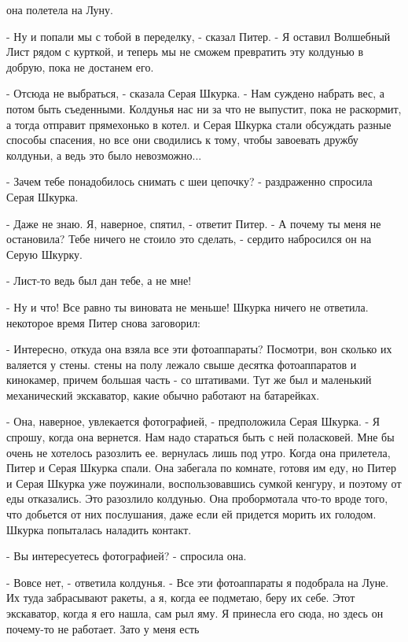 она полетела на Луну.
\par- Ну и попали мы с тобой в переделку, - сказал Питер. - Я оставил 
Волшебный Лист рядом с курткой, и теперь мы не сможем превратить эту 
колдунью в добрую, пока не достанем его.
\par- Отсюда не выбраться, - сказала Серая Шкурка. - Нам суждено 
набрать вес, а потом быть съеденными. Колдунья нас ни за что не 
выпустит, пока не раскормит, а тогда отправит прямехонько в котел.
 и Серая Шкурка стали обсуждать разные способы спасения, но 
все они сводились к тому, чтобы завоевать дружбу колдуньи, а ведь это 
было невозможно...
\par- Зачем тебе понадобилось снимать с шеи цепочку? - раздраженно 
спросила Серая Шкурка.
\par- Даже не знаю. Я, наверное, спятил, - ответит Питер. - А почему 
ты меня не остановила? Тебе ничего не стоило это сделать, - сердито 
набросился он на Серую Шкурку.
\par- Лист-то ведь был дан тебе, а не мне!
\par- Ну и что! Все равно ты виновата не меньше!
 Шкурка ничего не ответила.
 некоторое время Питер снова заговорил:
\par- Интересно, откуда она взяла все эти фотоаппараты? Посмотри, вон 
сколько их валяется у стены.
 стены на полу лежало свыше десятка фотоаппаратов и кинокамер, 
причем большая часть - со штативами. Тут же был и маленький 
механический экскаватор, какие обычно работают на батарейках.
\par- Она, наверное, увлекается фотографией, - предположила Серая 
Шкурка. - Я спрошу, когда она вернется. Нам надо стараться быть с ней 
поласковей. Мне бы очень не хотелось разозлить ее.
 вернулась лишь под утро. Когда она прилетела, Питер и 
Серая Шкурка спали. Она забегала по комнате, готовя им еду, но Питер и 
Серая Шкурка уже поужинали, воспользовавшись сумкой кенгуру, и поэтому 
от еды отказались. Это разозлило колдунью. Она пробормотала что-то 
вроде того, что добьется от них послушания, даже если ей придется 
морить их голодом.
 Шкурка попыталась наладить контакт.
\par- Вы интересуетесь фотографией? - спросила она.
\par- Вовсе нет, - ответила колдунья. - Все эти фотоаппараты я 
подобрала на Луне. Их туда забрасывают ракеты, а я, когда ее подметаю, 
беру их себе. Этот экскаватор, когда я его нашла, сам рыл яму. Я 
принесла его сюда, но здесь он почему-то не работает. Зато у меня есть 
